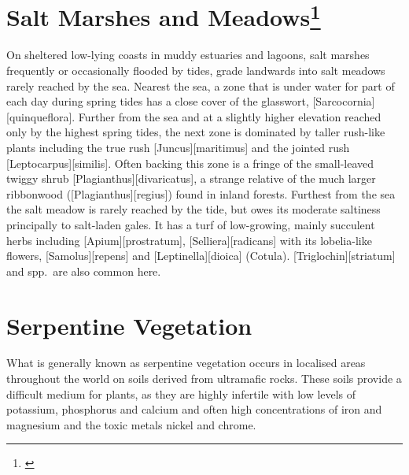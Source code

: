 \section[Salt Marshes and Meadows]{Salt Marshes and Meadows\thinspace\footnote{\cite{moore1963plants}}}

On sheltered low-lying coasts in muddy estuaries and lagoons, salt marshes frequently or occasionally flooded by tides, grade landwards into salt meadows rarely reached by the sea.
Nearest the sea, a zone that is under water for part of each day during spring tides has a close cover of the glasswort, [Sarcocornia][quinqueflora].
Further from the sea and at a slightly higher elevation reached only by the highest spring tides, the next zone is dominated by taller rush-like plants including the true rush [Juncus][maritimus] and the jointed rush [Leptocarpus][similis].
Often backing this zone is a fringe of the small-leaved twiggy shrub [Plagianthus][divaricatus], a strange relative of the much larger ribbonwood ([Plagianthus][regius]) found in inland forests.
Furthest from the sea the salt meadow is rarely reached by the tide, but owes its moderate saltiness principally to salt-laden gales.
It has a turf of low-growing, mainly succulent herbs including [Apium][prostratum], [Selliera][radicans] with its lobelia-like flowers, [Samolus][repens] and [Leptinella][dioica] (Cotula). [Triglochin][striatum] and  spp.\ are also common here.

\section{Serpentine Vegetation}

What is generally known as serpentine vegetation occurs in localised areas throughout the world on soils derived from ultramafic rocks.
These soils provide a difficult medium for plants, as they are highly infertile with low levels of potassium, phosphorus and calcium and often high concentrations of iron and magnesium and the toxic metals nickel and chrome.

